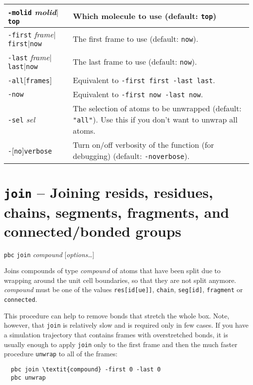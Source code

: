 \documentclass[a4paper, DIV12]{scrartcl}
\begin{document}
\begin{tabular}{|p{}|p{}|}
\hline

\texttt{-molid} \textit{molid}$|$\texttt{top}
& Which molecule to use (default: \texttt{top})
\\ \hline

\texttt{-first} \textit{frame}$|$\texttt{first}$|$\texttt{now}
& The first frame to use (default: \texttt{now}).
\\ \hline

\texttt{-last} \textit{frame}$|$\texttt{last}$|$\texttt{now}
& The last frame to use (default: \texttt{now}).
\\ \hline

\texttt{-all}[\texttt{frames}]
& Equivalent to \texttt{-first first -last last}.
\\ \hline

\texttt{-now}
& Equivalent to \texttt{-first now -last now}.
\\ \hline

\texttt{-sel} \textit{sel}
& The selection of atoms to be unwrapped (default: \texttt{"all"}). Use
this if you don't want to unwrap all atoms.
\\ \hline

\texttt{-}[\texttt{no}]\texttt{verbose}
& Turn on/off verbosity of the function (for debugging) (default:
\texttt{-noverbose}).
\\ \hline
\end{tabular}


\newpage
\section{\texttt{join} -- Joining resids, residues, chains, segments, fragments,
  and connected/bonded groups}
\label{sec:join}


\texttt{pbc} \texttt{join} \textit{compound} [\textit{options}\dots]


Joins compounds of type \textit{compound} of atoms that have been
split due to wrapping around the unit cell boundaries, so that they
are not split anymore. \textit{compound} must be one of the values
\texttt{res[id[ue]]}, \texttt{chain}, \texttt{seg[id]},
\texttt{fragment} or \texttt{connected}.

This procedure can help to remove bonds that stretch the whole box.
Note, however, that \texttt{join} is relatively slow and is required
only in few cases.  If you have a simulation trajectory that contains
frames with overstretched bonds, it is usually enough to apply
\texttt{join} only to the first frame and then the much faster
procedure \texttt{unwrap} to all of the frames:
\begin{Verbatim}
  pbc join \textit{compound} -first 0 -last 0 
  pbc unwrap
\end{Verbatim}
\end{document}

